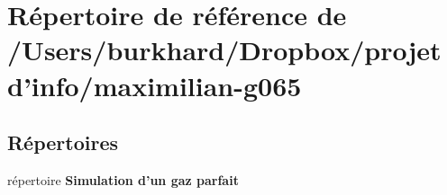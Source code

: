 \section{Répertoire de référence de /\+Users/burkhard/\+Dropbox/projet d'info/maximilian-\/g065}
\label{dir_1fc57af7395e7964fd1dc446c4fdc94a}
\subsection*{Répertoires}
\begin{DoxyCompactItemize}
\item 
répertoire {\bf Simulation d'un gaz parfait}
\end{DoxyCompactItemize}
